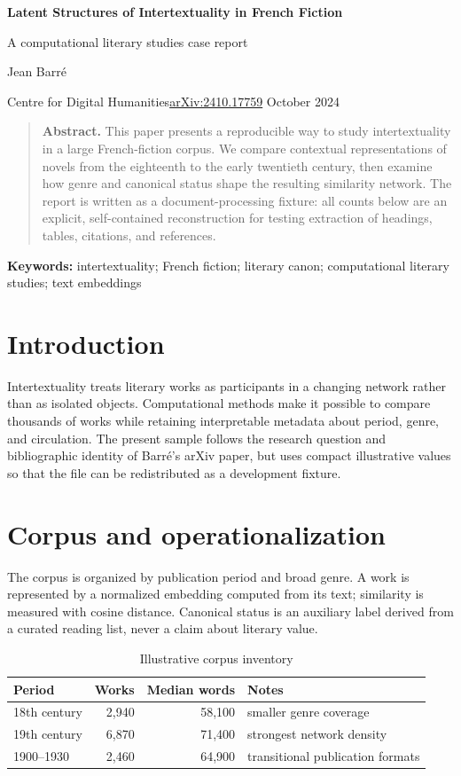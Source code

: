 \documentclass[11pt,a4paper]{article}
\begin{document}
\begin{center}
{\color{navy}\fontsize{19}{23}\selectfont\bfseries Latent Structures of Intertextuality in French Fiction\par}
\vspace{2mm}
{\large A computational literary studies case report\par}
\vspace{3mm}
Jean Barré\par
{\small Centre for Digital Humanities\quad\href{https://arxiv.org/abs/2410.17759}{arXiv:2410.17759} October 2024}
\end{center}
\vspace{3mm}
\begin{quote}\small
\textbf{Abstract.} This paper presents a reproducible way to study intertextuality in a large French-fiction corpus. We compare contextual representations of novels from the eighteenth to the early twentieth century, then examine how genre and canonical status shape the resulting similarity network. The report is written as a document-processing fixture: all counts below are an explicit, self-contained reconstruction for testing extraction of headings, tables, citations, and references.
\end{quote}
\noindent\textbf{Keywords:} intertextuality; French fiction; literary canon; computational literary studies; text embeddings
\section{Introduction}
Intertextuality treats literary works as participants in a changing network rather than as isolated objects. Computational methods make it possible to compare thousands of works while retaining interpretable metadata about period, genre, and circulation. The present sample follows the research question and bibliographic identity of Barré's arXiv paper, but uses compact illustrative values so that the file can be redistributed as a development fixture.
\section{Corpus and operationalization}
The corpus is organized by publication period and broad genre. A work is represented by a normalized embedding computed from its text; similarity is measured with cosine distance. Canonical status is an auxiliary label derived from a curated reading list, never a claim about literary value.
\begin{table}[ht]
\centering
\caption{Illustrative corpus inventory}
\begin{tabularx}{0.92\linewidth}{l r r X}
\toprule
Period & Works & Median words & Notes\\
\midrule
18th century & 2,940 & 58,100 & smaller genre coverage\\
19th century & 6,870 & 71,400 & strongest network density\\
1900--1930 & 2,460 & 64,900 & transitional publication formats\\
\bottomrule
\end{tabularx}
\end{table}
\end{document}

